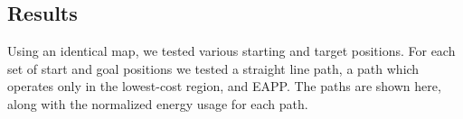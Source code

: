 \documentclass[journal]{IEEEtran}
\newcounter{row}
\newcounter{col}
\begin{document}
\subsection{Results}
Using an identical map, we tested various starting and target positions. 
For each set of start and goal positions we tested a straight line path, a path which operates only in the lowest-cost region, and EAPP.
The paths are shown here, along with the normalized energy usage for each path. 



%


\end{document}

